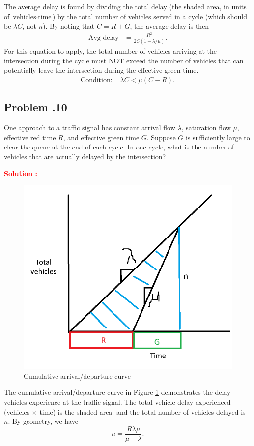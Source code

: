 \documentclass[12pt]{article}
\newcommand{\customsubsection}[1]{
  \subsection*{Problem \thesection.#1}
}
\begin{document}
The average delay is found by dividing the total delay (the shaded area, in units of $\text{vehicles} \cdot \text{time}$) by the total number of vehicles served in a cycle (which should be $\lambda C$, not $n$). By noting that $C = R + G$, the average delay is then
\begin{align*}
    \text{Avg delay} &= \frac{R^2}{2C(1 - \lambda / \mu)}.
\end{align*}
For this equation to apply, the total number of vehicles arriving at the intersection during the cycle must NOT exceed the number of vehicles that can potentially leave the intersection during the effective green time.
\begin{align*}
    \text{Condition: } & \lambda C < \mu (C - R).
\end{align*}
\newpage


\customsubsection{10}
 One approach to a traffic signal has constant arrival flow $\lambda$, saturation flow $\mu$, effective red time $R$, and effective green time $G$. Suppose $G$ is sufficiently large to clear the queue at the end of each cycle. In one cycle, what is the number of vehicles that are actually delayed by the intersection? 

\textbf{\textcolor{red}{Solution :}} \\

 \begin{figure}[h!]
        \centering
        \includegraphics[width=0.5\linewidth]{img/P6_10.png}
        \caption{Cumulative arrival/departure curve}
        \label{fig:P6_10}
\end{figure}

The cumulative arrival/departure curve in Figure \ref{fig:P6_10} demonstrates the delay vehicles experience at the traffic signal. The total vehicle delay experienced (vehicles $\times$ time)  is the shaded area, and the total number of vehicles delayed is $n$. By geometry, we have 
\[
n=\frac{R \lambda\mu}{\mu -\lambda}.
\]
\newpage
\end{document}
